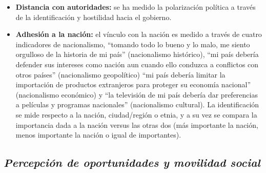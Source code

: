 \documentclass[
  12pt,
]{book}
\begin{document}
\begin{itemize}
\item
  \textbf{Distancia con autoridades:} se ha medido la polarización política a través de la identificación y hostilidad hacia el gobierno.
\item
  \textbf{Adhesión a la nación:} el vínculo con la nación es medido a través de cuatro indicadores de nacionalismo, ``tomando todo lo bueno y lo malo, me siento orgulloso de la historia de mi país'' (nacionalismo histórico), ``mi país debería defender sus intereses como nación aun cuando ello conduzca a conflictos con otros países'' (nacionalismo geopolítico) ``mi país debería limitar la importación de productos extranjeros para proteger su economía nacional'' (nacionalismo económico) y ``la televisión de mi país debería dar preferencias a películas y programas nacionales'' (nacionalismo cultural). La identificación se mide respecto a la nación, ciudad/región o etnia, y a su vez se compara la importancia dada a la nación versus las otras dos (más importante la nación, menos importante la nación o igual de importantes).
\end{itemize}

\hypertarget{percepciuxf3n-de-oportunidades-y-movilidad-social}{%
\subsection{\texorpdfstring{\emph{Percepción de oportunidades y movilidad social}}{Percepción de oportunidades y movilidad social}}\label{percepciuxf3n-de-oportunidades-y-movilidad-social}}
\end{document}
